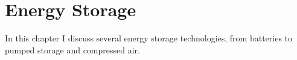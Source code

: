 \setchapterpreamble[u]{\margintoc}
\chapter{Energy Storage}

In this chapter I discuss several energy storage technologies, from batteries to pumped storage and compressed air.